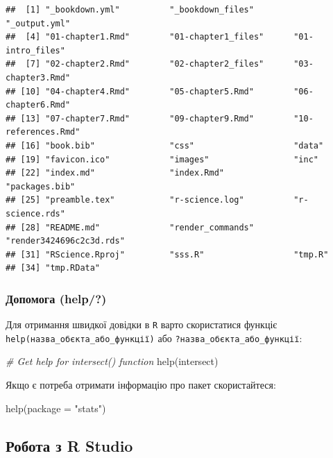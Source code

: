 \documentclass[
]{book}
\newenvironment{Shaded}{\begin{snugshade}}{\end{snugshade}}
\newcommand{\AttributeTok}[1]{\textcolor[rgb]{0.77,0.63,0.00}{#1}}
\newcommand{\CommentTok}[1]{\textcolor[rgb]{0.56,0.35,0.01}{\textit{#1}}}
\newcommand{\FunctionTok}[1]{\textcolor[rgb]{0.00,0.00,0.00}{#1}}
\newcommand{\NormalTok}[1]{#1}
\newcommand{\StringTok}[1]{\textcolor[rgb]{0.31,0.60,0.02}{#1}}
\begin{document}
\begin{verbatim}
##  [1] "_bookdown.yml"          "_bookdown_files"        "_output.yml"           
##  [4] "01-chapter1.Rmd"        "01-chapter1_files"      "01-intro_files"        
##  [7] "02-chapter2.Rmd"        "02-chapter2_files"      "03-chapter3.Rmd"       
## [10] "04-chapter4.Rmd"        "05-chapter5.Rmd"        "06-chapter6.Rmd"       
## [13] "07-chapter7.Rmd"        "09-chapter9.Rmd"        "10-references.Rmd"     
## [16] "book.bib"               "css"                    "data"                  
## [19] "favicon.ico"            "images"                 "inc"                   
## [22] "index.md"               "index.Rmd"              "packages.bib"          
## [25] "preamble.tex"           "r-science.log"          "r-science.rds"         
## [28] "README.md"              "render_commands"        "render3424696c2c3d.rds"
## [31] "RScience.Rproj"         "sss.R"                  "tmp.R"                 
## [34] "tmp.RData"
\end{verbatim}

\hypertarget{chapter1315}{%
\subsubsection{Допомога (help/?)}\label{chapter1315}}

Для отримання швидкої довідки в \texttt{R} варто скористатися функціє \texttt{help(назва\_об\textquotesingle{}єкта\_або\_функції)} або \texttt{?назва\_об\textquotesingle{}єкта\_або\_функції}:

\begin{Shaded}
\begin{Highlighting}[]
\CommentTok{\# Get help for intersect() function}
\FunctionTok{help}\NormalTok{(intersect)}
\end{Highlighting}
\end{Shaded}

Якщо є потреба отримати інформацію про пакет скористайтеся:

\begin{Shaded}
\begin{Highlighting}[]
\FunctionTok{help}\NormalTok{(}\AttributeTok{package =} \StringTok{"stats"}\NormalTok{)}
\end{Highlighting}
\end{Shaded}

\hypertarget{chapter132}{%
\subsection{Робота з R Studio}\label{chapter132}}
\end{document}
